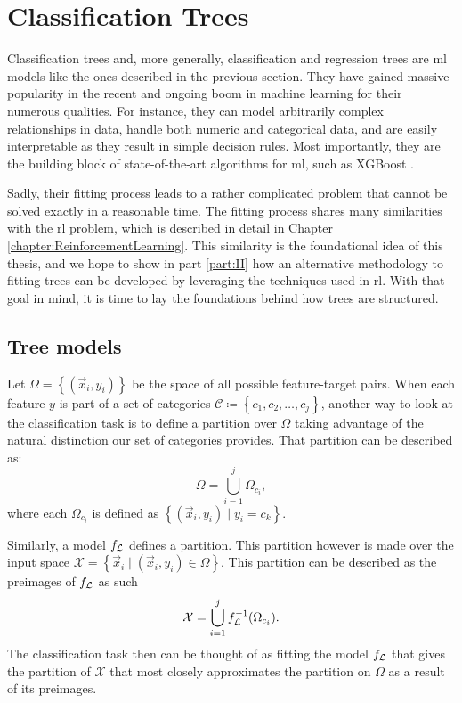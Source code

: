 \section{Classification Trees}

Classification trees and, more generally, classification and regression trees
are \ac{ml} models like the ones described in the previous section.  They have
gained massive popularity in the recent and ongoing boom in machine learning for
their numerous qualities. For instance, they can model arbitrarily complex
relationships in data, handle both numeric and categorical data, and are easily
interpretable as they result in simple decision rules. Most importantly, they
are the building block of state-of-the-art algorithms for \ac{ml}, such as
XGBoost \cite{XGBoost}.

Sadly, their fitting process leads to a rather complicated problem that cannot
be solved exactly in a reasonable time. The fitting process shares many
similarities with the \ac{rl} problem, which is described in detail in Chapter
\ref{chapter:ReinforcementLearning}. This similarity is the foundational idea of
this thesis, and we hope to show in part \ref{part:II} how an alternative
methodology to fitting trees can be developed by leveraging the techniques used
in \ac{rl}. With that goal in mind, it is time to lay the foundations behind how
trees are structured.

\subsection{Tree models}

Let $\Omega = \left\{ (\vec{x}_i, y_i) \right\}$ be the space of all possible
feature-target pairs. When each feature $y$ is part of a set of categories
$\mathcal{C} \coloneqq \left\{ c_1, c_2, \dots, c_j \right\}$, another way to
look at the classification task is to define a partition over $\Omega$ taking
advantage of the natural distinction our set of categories provides. That
partition can be described as:
\[
    \Omega = \bigcup_{i=1}^{j} \Omega_{c_i},
\]
where each $\Omega_{c_i}$ is defined as $\left\{ (\vec{x}_i, y_i) \mid y_i = c_k
\right\}$.

Similarly, a model $f_{\mathcal{L}}$ defines a partition. This partition however is made
over the input space $\mathcal{X} = \left\{ \vec{x}_i \mid (\vec{x}_i, y_i) \in
\Omega \right\}$. This partition can be described as the preimages of $f_{\mathcal{L}}$ as
such
\[
    \mathcal{X} = \bigcup_{i=1}^{j} f_{\mathcal{L}}^{-1}(\Omega_{c_i}).
\]
The classification task then can be thought of as fitting the model $f_{\mathcal{L}}$ that
gives the partition of $\mathcal{X}$ that most closely approximates the
partition on $\Omega$ as a result of its preimages.

